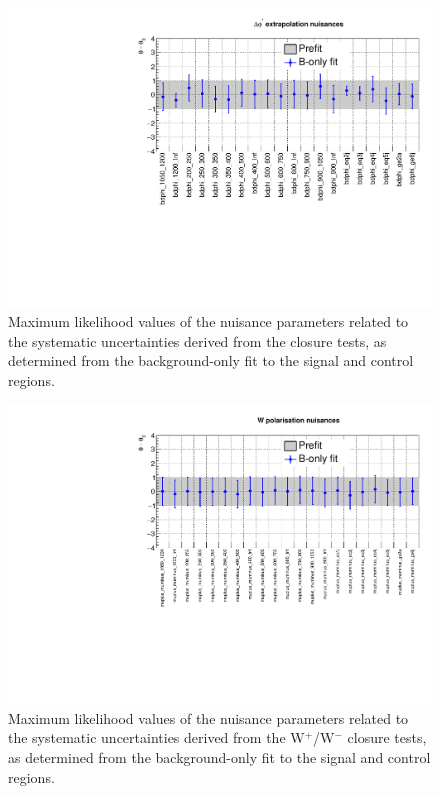 \begin{figure}[h!]
	\centering
	\includegraphics[width=0.8\linewidth]{figs/results/nuis/bDPhi_nuisances}
	\caption{Maximum likelihood values of the nuisance parameters related to 
	the systematic uncertainties derived from the \bdphi closure tests, as 
	determined from the background-only fit to the signal and control regions.}
\end{figure}

%	

\begin{figure}[h!]
	\centering
	\includegraphics[width=0.8\linewidth]{figs/results/nuis/WPol_nuisances}
	\caption{Maximum likelihood values of the nuisance parameters related to 
	the systematic uncertainties derived from the W$^{+}$/W$^{-}$ closure 
	tests, as determined from the background-only fit to the signal and control 
	regions.}
\end{figure}


